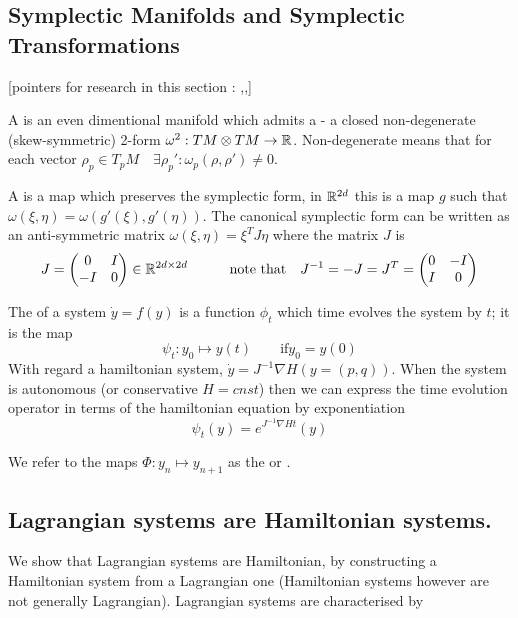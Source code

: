 \documentclass[12pt]{article}
\begin{document}
\subsection{Symplectic Manifolds and Symplectic Transformations}
[pointers for research in this section : \cite{Omar},\cite{Numerical},\cite{Duruisseaux}]

A  is an even dimentional manifold which admits a  - a closed non-degenerate (skew-symmetric) 2-form $\omega^2 : TM\otimes TM \to \mathbb{R}$. Non-degenerate means that for each vector $\rho_p\in T_p M\quad \exists \rho_p' : \omega_p(\rho,\rho')\neq 0$. 

A  is a map which preserves the symplectic form, in $\mathbb{R}^{2d}$ this is a map $g$ such that $\omega(\xi,\eta) = \omega(g'(\xi),g'(\eta))$. The canonical symplectic form can be written as an anti-symmetric matrix $\omega(\xi,\eta) = \xi^T J \eta$ where the matrix $J$ is
\begin{equation}\label{eq:matrix J}
    J = \begin{pmatrix} 0 & I\\ -I& 0 \end{pmatrix}\in \mathbb{R}^{2d\times 2d}\qquad\quad \text{note that}\quad J^{-1} = -J = J^T = \begin{pmatrix} 0& -I\\ I&0 \end{pmatrix}
\end{equation}

The  of a system $\dot y = f(y)$ is a function $\phi_t$ which time evolves the system by $t$; it is the map
\begin{equation}\label{eq:flow}\psi_t : y_0\mapsto y(t)\qquad \text{if} y_0 = y(0)\end{equation}
With regard a hamiltonian system, $\dot y = J^{-1}\nabla H(y=(p,q))$. When the system is autonomous (or conservative $H = cnst$) then we can express the time evolution operator in terms of the hamiltonian equation by exponentiation
\begin{equation}\label{eq:time evolution autonomous hamiltonian}
    \psi_t(y) = e^{J^{-1}\nabla H t}(y)
\end{equation}

We refer to the maps $\Phi : y_n\mapsto y_{n+1}$ as the  or . 

\subsection{Lagrangian systems are Hamiltonian systems.}
We show that Lagrangian systems are Hamiltonian, by constructing a Hamiltonian system from a Lagrangian one (Hamiltonian systems however are not generally Lagrangian). Lagrangian systems are characterised by
\end{document}
